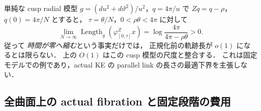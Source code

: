 \begin{remark}[時間幅の消失と距離費用の違い]
\label{ke:parallel-liouville-cusp-sharpness}
単純な cusp radial 模型
\(g=(du^2+d\vartheta^2)/u^2\)，\(q=4\pi/u\) で
\(Zq=q-\rho\)，\(q(0)=4\pi/N\) とすると，
\(\tau=\theta/N\)，\(0<\rho\theta<4\pi\) に対して
\[
 \lim_{N\to\infty}
 \operatorname{Length}_{g}(\varphi_{[0,\tau]}^Zx)
 =\log\frac{4\pi}{4\pi-\rho\theta}>0.
\]
従って \emph{時間が零へ縮む}という事実だけでは，
正規化前の軌跡長が \(o(1)\) になるとは限らない．
上の \(O(1)\) はこの cusp 模型の尺度と整合する．
これは固定モデルでの例であり，actual KE の
parallel link の長さの最適下界を主張しない．
\end{remark}

\subsection{全曲面上の actual fibration と固定段階の費用}

